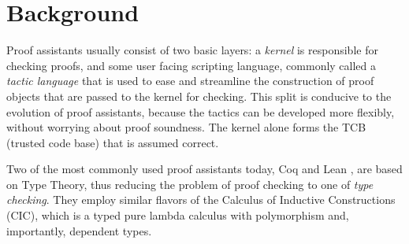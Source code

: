 \section{Background}
\label{lweqsat:background}

Proof assistants usually consist of two basic layers: a \emph{kernel} is responsible for checking proofs, and some user facing scripting language, commonly called a \emph{tactic language} that is used to ease and streamline the construction of proof objects that are passed to the kernel for checking.
This split is conducive to the evolution of proof assistants, because the tactics can be developed more flexibly, without worrying about proof soundness.
The kernel alone forms the TCB (trusted code base) that is assumed correct.

Two of the most commonly used proof assistants today, Coq and Lean \cite{Coq:manual,lean}, are based on Type Theory, thus reducing the problem of proof checking to one of \emph{type checking}.
They employ similar flavors of the Calculus of Inductive Constructions (CIC), which is a typed pure lambda calculus with polymorphism and, importantly, dependent types.

